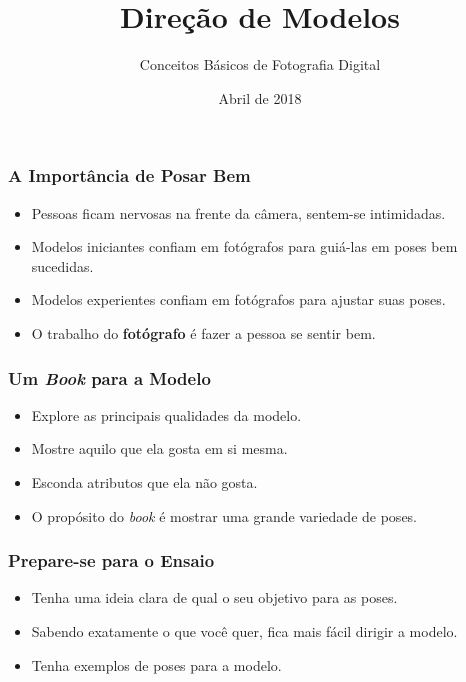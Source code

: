 


\title{Direção de Modelos}
\subtitle{Conceitos Básicos de Fotografia Digital}
\author{}
\date{Abril de 2018}



\coverframe

\begin{frame}
  \frametitle{A Importância de Posar Bem}
  \begin{itemize}
      \item Pessoas ficam nervosas na frente da câmera, sentem-se intimidadas.
      \item Modelos iniciantes confiam em fotógrafos para guiá-las em poses bem sucedidas.
      \item Modelos experientes confiam em fotógrafos para ajustar suas poses.
      \item O trabalho do \textbf{fotógrafo} é fazer a pessoa se sentir bem.
  \end{itemize}
\end{frame}

\begin{frame}
  \frametitle{Um \textit{Book} para a Modelo}
  \begin{itemize}
      \item Explore as principais qualidades da modelo.
      \item Mostre aquilo que ela gosta em si mesma.
      \item Esconda atributos que ela não gosta.
      \item O propósito do \textit{book} é mostrar uma grande variedade de poses.
  \end{itemize}
\end{frame}

\begin{frame}
  \frametitle{Prepare-se para o Ensaio}
  \begin{itemize}
      \item Tenha uma ideia clara de qual o seu objetivo para as poses.
      \item Sabendo exatamente o que você quer, fica mais fácil dirigir a modelo.
      \item Tenha exemplos de poses para a modelo.
  \end{itemize}
\end{frame}

